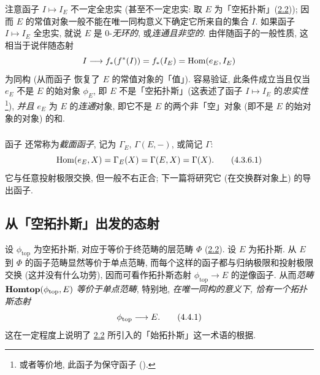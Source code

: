 

\subsubsection{}
注意函子 $I\mapsto I_E$ 不一定全忠实 (甚至不一定忠实: 取 $E$ 为「空拓扑斯」(\hyperref[IV.subsec2.2]{2.2})); 因而 $E$ 的常值对象一般不能在唯一同构意义下确定它所来自的集合 $I$. 如果函子 $I\mapsto I_E$ 全忠实, 就说 $E$ 是 $0$-\emph{无环的}, 或\emph{连通且非空的}. 由伴随函子的一般性质, 这相当于说伴随态射
$$
I\longrightarrow f_{\ast}(f^{\ast}(I))=f_{\ast}(I_E)=\operatorname{Hom}(e_E, I_E)
$$
为\pageoriginale 同构 (从而函子  恢复了 $E$ 的常值对象的「值」). 容易验证, 此条件成立当且仅当 $e_E$ 不是 $E$ 的始对象 $\phi_E$, 即 $E$ 不是「空拓扑斯」(这表述了函子 $I\mapsto I_E$ 的\emph{忠实性}\footnote[1]{或者等价地, 此函子为保守函子 ().}), \emph{并且} $e_E$ 为 $E$ 的\emph{连通}对象, 即它不是 $E$ 的两个非「空」对象 (即不是 $E$ 的始对象的对象) 的和.

\subsubsection{}
函子  还常称为\emph{截面函子}, 记为 $\Gamma_E$, $\Gamma(E,-)$, 或简记 $\Gamma$:
\hypertarget{sga4.exp.IV.equation.4.3.6.1}{}\begin{equation*}
\operatorname{Hom}(e_E,X)=\Gamma_E(X)=\Gamma(E,X)=\Gamma(X){}.\tag{4.3.6.1}
\end{equation*}
它与任意投射极限交换, 但一般不右正合; 下一篇将研究它 (在交换群对象上) 的导出函子.

\subsection{从「空拓扑斯」出发的态射}

设 $\phi_{\text{top}}$ 为空拓扑斯, 对应于等价于终范畴的层范畴 $\Phi$ (\hyperref[IV.subsec2.2]{2.2}). 设 $E$ 为拓扑斯. 从 $E$ 到 $\Phi$ 的函子范畴显然等价于单点范畴, 而每个这样的函子都与归纳极限和投射极限交换 (这并没有什么功劳), 因而可看作拓扑斯态射 $\phi_{\text{top}}\rightarrow E$ 的逆像函子. 从而\emph{范畴 $\operatorname{\mathbf{Homtop}}(\phi_{\text{top}},E)$ 等价于单点范畴}, 特别地, \emph{在唯一\pageoriginale 同构的意义下, 恰有一个拓扑斯态射}
\begin{equation*}
\phi_{\text{top}}\longrightarrow E{}.\tag{4.4.1}
\end{equation*}
这在一定程度上说明了 \hyperref[IV.subsec2.2]{2.2} 所引入的「始拓扑斯」这一术语的根据.

